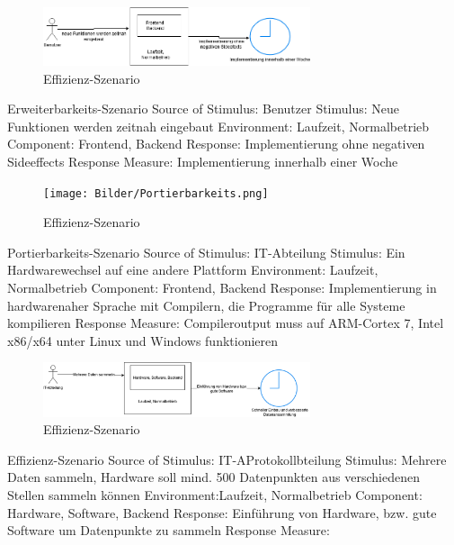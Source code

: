 \documentclass[12pt]{article}
\begin{document}
\begin{figure}[tbh]
  \centering
  \includegraphics[width=0.7\textwidth]{Bilder/Erweiterbarkeit.png}
  \caption{Effizienz-Szenario}
  \label{fig:Qualitaet3}
\end{figure}


Erweiterbarkeits-Szenario
Source of Stimulus: Benutzer
Stimulus: Neue Funktionen werden zeitnah eingebaut
Environment: Laufzeit, Normalbetrieb
Component: Frontend, Backend
Response: Implementierung ohne negativen Sideeffects
Response Measure: Implementierung innerhalb einer Woche 



\begin{figure}[tbh]
  \centering
  \texttt{[image: Bilder/Portierbarkeits.png]}
  \caption{Effizienz-Szenario}
  \label{fig:Qualitaet4}
\end{figure}



Portierbarkeits-Szenario
Source of Stimulus: IT-Abteilung
Stimulus: Ein Hardwarewechsel auf eine andere Plattform
Environment: Laufzeit, Normalbetrieb
Component: Frontend, Backend
Response: Implementierung in hardwarenaher Sprache mit Compilern, die Programme für alle Systeme kompilieren 
Response Measure: Compileroutput muss auf ARM-Cortex 7, Intel x86/x64 unter Linux und Windows funktionieren




\begin{figure}[tbh]
  \centering
  \includegraphics[width=0.7\textwidth]{Bilder/Effizienz.png}
  \caption{Effizienz-Szenario}
  \label{fig:Qualitaet5}
\end{figure}



Effizienz-Szenario
Source of Stimulus: IT-AProtokollbteilung
Stimulus: Mehrere Daten sammeln, Hardware soll mind. 500 Datenpunkten aus verschiedenen Stellen sammeln können
Environment:Laufzeit, Normalbetrieb
Component: Hardware, Software, Backend
Response: Einführung von Hardware, bzw. gute Software um Datenpunkte zu sammeln
Response Measure: 
\end{document}
